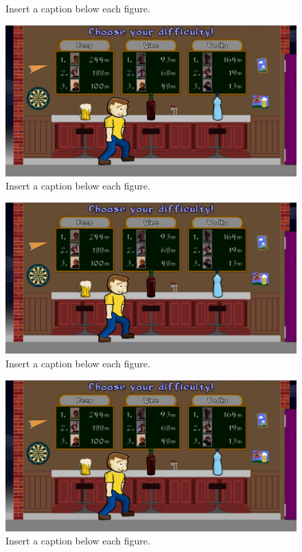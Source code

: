 \documentclass{chi-ext}
\begin{document}
\begin{itemize}
{\begin{figure}
  \caption{Insert a caption below each figure.}
  \label{fig:screenshot1}
\end{figure}
\begin{figure}
  \centering
  \includegraphics[width=\linewidth]{pictures/screenshot2.jpg}
  \caption{Insert a caption below each figure.}
  \label{fig:screenshot2}
\end{figure}
\begin{figure}
  \centering
  \includegraphics[width=\linewidth]{pictures/screenshot2.jpg}
  \caption{Insert a caption below each figure.}
  \label{fig:screenshot3}
\end{figure}
\begin{figure}
  \centering
  \includegraphics[width=\linewidth]{pictures/screenshot2.jpg}
  \caption{Insert a caption below each figure.}
  \label{fig:screenshot4}
\end{figure}
}
\end{itemize}
\end{document}
